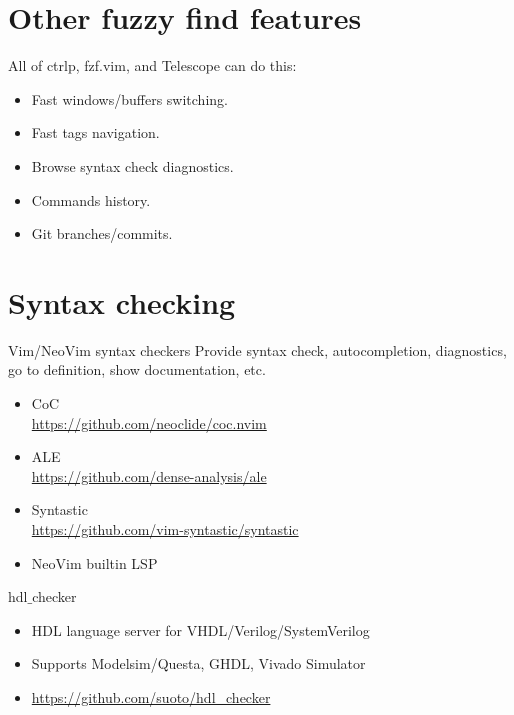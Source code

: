 \documentclass[aspectratio=169]{beamer}
\begin{document}
\section*{Other fuzzy find features}
\begin{frame}{\secname}
  All of ctrlp, fzf.vim, and Telescope can do this: 
  \begin{itemize}
    \item Fast windows/buffers switching. 
    \item Fast tags navigation. 
    \item Browse syntax check diagnostics. 
    \item Commands history. 
    \item Git branches/commits.
  \end{itemize}
  	
\end{frame}


\section*{Syntax checking}
\begin{frame}{\secname}

  \begin{block}{Vim/NeoVim syntax checkers}
    Provide syntax check, autocompletion, diagnostics, go to definition, show documentation, etc.
  \begin{itemize}
    \item CoC  \\ \url{https://github.com/neoclide/coc.nvim} 
    \item ALE \\ \url{https://github.com/dense-analysis/ale}
    \item Syntastic \\ \url{https://github.com/vim-syntastic/syntastic}
    \item NeoVim builtin LSP
  \end{itemize}
  \end{block}

  \begin{block}{hdl$\_$checker}
    \begin{itemize}
     \item HDL language server  for VHDL/Verilog/SystemVerilog
     \item Supports Modelsim/Questa, GHDL, Vivado Simulator
     \item \url{https://github.com/suoto/hdl_checker}
    \end{itemize}
    
  \end{block}
    
\end{frame}
\end{document}
